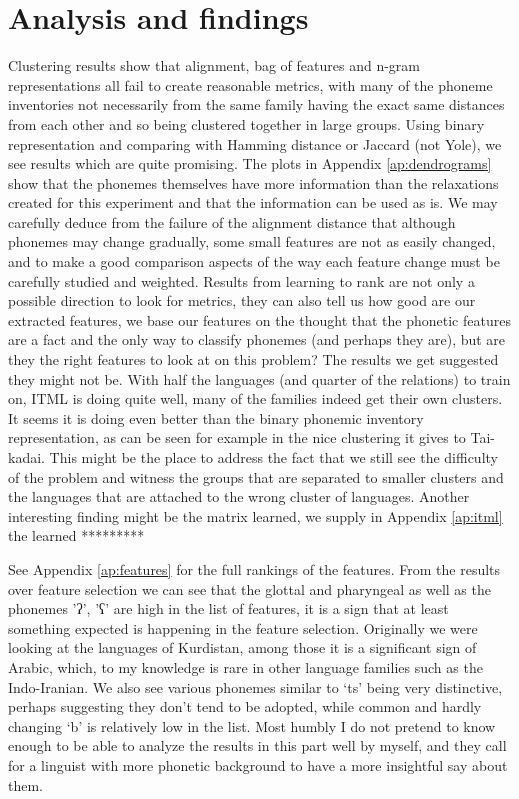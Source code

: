 \documentclass[letterpaper, 11pt]{article}
\begin{document}
\section{Analysis and findings}
Clustering results show that alignment, bag of features and n-gram representations all fail to create reasonable metrics, with many of the phoneme inventories not necessarily from the same family having the exact same distances from each other and so being clustered together in large groups. Using binary representation and comparing with Hamming distance or Jaccard (not Yole), we see results which are quite promising. The plots in Appendix \ref{ap:dendrograms} show that the phonemes themselves have more information than the relaxations created for this experiment and that the information can be used as is.
We may carefully deduce from the failure of the alignment distance that although phonemes may change gradually, some small features are not as easily changed, and to make a good comparison aspects of the way each feature change must be carefully studied and weighted.
Results from learning to rank are not only a possible direction to look for metrics, they can also tell us how good are our extracted features, we base our features on the thought that the phonetic features are a fact and the only way to classify phonemes (and perhaps they are), but are they the right features to look at on this problem? The results we get suggested they might not be. With half the languages (and quarter of the relations) to train on, ITML is doing quite well, many of the families indeed get their own clusters. It seems it is doing even better than the binary phonemic inventory representation, as can be seen for example in the nice clustering it gives to Tai-kadai. 
This might be the place to address the fact that we still see the difficulty of the problem and witness the groups that are separated to smaller clusters and the languages that are attached to the wrong cluster of languages. Another interesting finding might be the matrix learned, we supply in Appendix \ref{ap:itml} the learned *********

See Appendix \ref{ap:features} for the full rankings of the features. From the results over feature selection we can see that the glottal and pharyngeal as well as the phonemes 'ʔ', 'ʕ' are high in the list of features, it is a sign that at least something expected is happening in the feature selection. Originally we were looking at the languages of Kurdistan, among those it is a significant sign of Arabic, which, to my knowledge is rare in other language families such as the Indo-Iranian. We also see various phonemes similar to ‘ts’ being very distinctive, perhaps suggesting they don’t tend to be adopted, while common and hardly changing ‘b’ is relatively low in the list.
Most humbly I do not pretend to know enough to be able to analyze the results in this part well by myself, and they call for a linguist with more phonetic background to have a more insightful say about them.
\appendix
\end{document}
